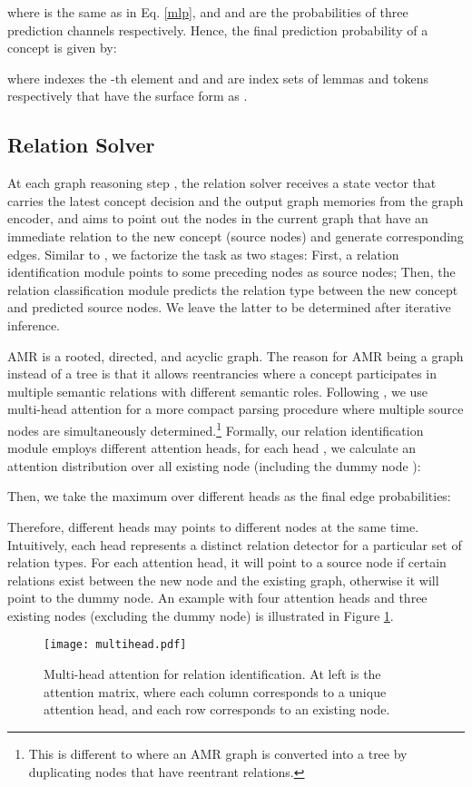 \documentclass[11pt,a4paper]{article}
\begin{document}
	where  is the same as in Eq. \ref{mlp}, and  and  are the probabilities of three prediction channels respectively.
	Hence, the final prediction probability of a concept  is given by:
	 
	where  indexes the -th element and  and  are index sets of lemmas and tokens respectively that have the surface
	form as .
	\subsection{Relation Solver}
	At each graph reasoning step , the relation solver receives a state vector  that carries the latest concept decision and the output graph memories  from the graph encoder, and aims to point out the nodes in the current graph that have an immediate relation to the new concept (source nodes) and generate corresponding edges. Similar to , we factorize the task as two stages: First, a relation identification module points to some preceding nodes as source nodes; Then, the relation classification module predicts the relation type between the new concept and predicted source nodes. We leave the latter to be determined after iterative inference.
	
	AMR is a rooted, directed, and acyclic graph. The reason for AMR being a graph instead of a tree is that it allows reentrancies where a concept participates in multiple semantic relations with different semantic roles. Following , we use multi-head attention for a more compact parsing procedure where multiple source nodes are simultaneously determined.\footnote{This is different to  where an AMR graph is converted into a tree by duplicating nodes that have reentrant relations.} Formally, our relation identification module employs  different attention heads, for each head , we calculate an attention distribution over all existing node (including the dummy node ):
	
	Then, we take the maximum over different heads as the final edge probabilities:
	
	Therefore, different heads may points to different nodes at the same time. Intuitively, each head represents a distinct relation detector for a particular set of relation types. For each attention head, it will point to a source node if certain relations exist between the new node and the existing graph, otherwise it will point to the dummy node. An example with four attention heads and three existing nodes (excluding the dummy node) is illustrated in Figure \ref{multihead}.
		\begin{figure}[t]
		\centering
		\texttt{[image: multihead.pdf]}
		\caption{Multi-head attention for relation identification. At left is the attention matrix, where each column corresponds to a unique attention head, and each row corresponds to an existing node.}
		\label{multihead}
	\end{figure}
\end{document}
